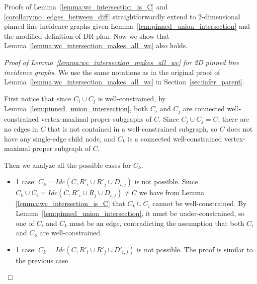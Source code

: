 Proofs of Lemma~\ref{lemma:wc_intersection_is_C} and \ref{corollary:no_edges_between_diff} straightforwardly extend to 2-dimensional pinned line incidence graphs
given Lemma~\ref{lem:pinned_union_intersection} and the modified definition of DR-plan.
Now we  show that Lemma~\ref{lemma:wc_intersection_makes_all_wc} also holds.

\begin{proof}[Proof of Lemma~\ref{lemma:wc_intersection_makes_all_wc} for 2D pinned line incidence graphs]
We use the same notations as in the original proof of Lemma~\ref{lemma:wc_intersection_makes_all_wc} in Section~\ref{sec:infer_parent}.

First notice that since $C_i \cup C_j$ is well-constrained, by Lemma~\ref{lem:pinned_union_intersection},
both $C_i$ and $C_j$ are connected well-constrained vertex-maximal proper subgraphs of  $C$.
Since $C_j \cup C_j = C$, there are no edges in $C$ that is not contained in a well-constrained subgraph, so $C$ does not have any single-edge child node, and $C_k$ is a connected well-constrained vertex-maximal proper subgraph of  $C$.

Then we analyze all the possible cases for $C_k$.
\begin{itemize}
    \item 1 case: $C_k=Idc(C,R'_i\cup R'_j\cup D_{i,j})$ is not possible. Since $C_k\cup C_i = Idc(C,R'_i\cup R_j\cup D_{i,j})\neq C$ we have from Lemma \ref{lemma:wc_intersection_is_C} that $C_k\cup C_i$ cannot be well-constrained.
    By Lemma~\ref{lem:pinned_union_intersection}, it must be under-constrained,
    so one of $C_i$ and $C_k$ must be an edge, contradicting the assumption that both $C_i$ and $C_k$ are well-constrained.

    \item 1 case: $C_k=Idc(C,R'_i\cup R'_j\cup D'_{i,j})$ is not possible. The proof is similar to the previous case.


\end{itemize}
\end{proof}
